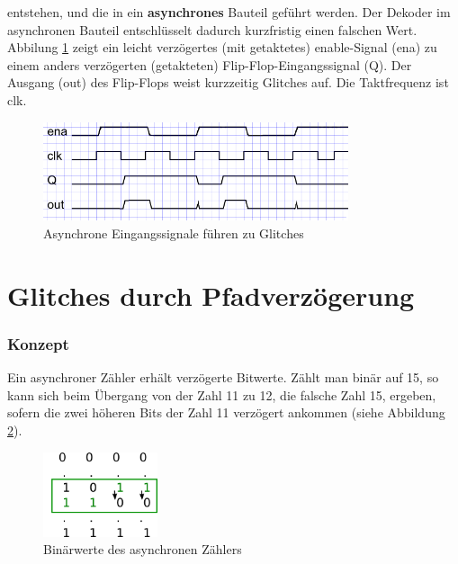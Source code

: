 entstehen, und die in ein \textbf{asynchrones} Bauteil geführt werden. Der Dekoder im asynchronen Bauteil entschlüsselt dadurch kurzfristig einen falschen Wert. \\

Abbilung \ref{fig.glitch.bild1} zeigt ein leicht verzögertes (mit getaktetes) enable-Signal (ena) zu einem anders verzögerten (getakteten) Flip-Flop-Eingangssignal (Q). Der Ausgang (out) des Flip-Flops weist kurzzeitig Glitches auf. Die Taktfrequenz ist clk.\\
\begin{figure}[H]
	\includegraphics[width=0.8\textwidth]{images/glitch/def_glitch_3.png}
	\caption{Asynchrone Eingangssignale führen zu Glitches}
	\label{fig.glitch.bild1}
\end{figure}


\newpage
\section{Glitches durch Pfadverzögerung}\label{sect.glitch_detect}


\subsubsection{Konzept}
Ein asynchroner Zähler erhält verzögerte Bitwerte. Zählt man binär auf 15, so kann sich beim Übergang von der Zahl 11 zu 12, die falsche Zahl 15, ergeben, sofern die zwei höheren Bits der Zahl 11 verzögert ankommen (siehe Abbildung \ref {fig.glitch.binaer_zahlen}).

\begin{figure}[H]
	\includegraphics[width=0.3\textwidth]{images/glitch/konzept_verzoegerung.png}
	\caption{Binärwerte des asynchronen Zählers}
	\label{fig.glitch.binaer_zahlen}
\end{figure}

